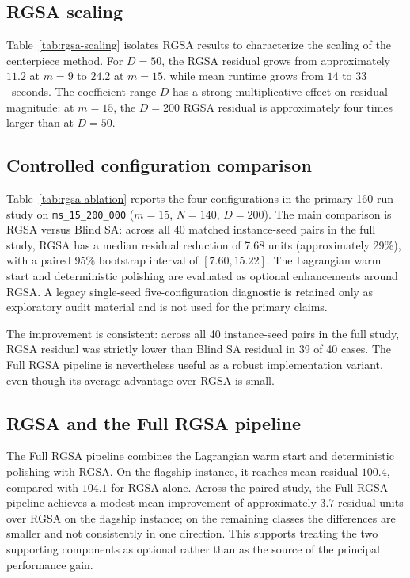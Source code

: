 \documentclass[11pt]{article}
\begin{document}


\subsection{RGSA scaling}

Table~\ref{tab:rgsa-scaling} isolates RGSA results to characterize the scaling of the centerpiece method. For $D=50$, the RGSA residual grows from approximately $11.2$ at $m=9$ to $24.2$ at $m=15$, while mean runtime grows from $14$ to $33$~seconds. The coefficient range $D$ has a strong multiplicative effect on residual magnitude: at $m=15$, the $D=200$ RGSA residual is approximately four times larger than at $D=50$.



\subsection{Controlled configuration comparison}
Table~\ref{tab:rgsa-ablation} reports the four configurations in the primary 160-run study on \texttt{ms\_15\_200\_000} ($m=15$, $N=140$, $D=200$). The main comparison is RGSA versus Blind SA: across all 40 matched instance-seed pairs in the full study, RGSA has a median residual reduction of 7.68 units (approximately 29\%), with a paired 95\% bootstrap interval of $[7.60,15.22]$. The Lagrangian warm start and deterministic polishing are evaluated as optional enhancements around RGSA. A legacy single-seed five-configuration diagnostic is retained only as exploratory audit material and is not used for the primary claims.



The improvement is consistent: across all 40 instance-seed pairs in the full study, RGSA residual was strictly lower than Blind SA residual in 39 of 40 cases. The Full RGSA pipeline is nevertheless useful as a robust implementation variant, even though its average advantage over RGSA is small.

\subsection{RGSA and the Full RGSA pipeline}

The Full RGSA pipeline combines the Lagrangian warm start and deterministic polishing with RGSA. On the flagship instance, it reaches mean residual $100.4$, compared with $104.1$ for RGSA alone. Across the paired study, the Full RGSA pipeline achieves a modest mean improvement of approximately $3.7$ residual units over RGSA on the flagship instance; on the remaining classes the differences are smaller and not consistently in one direction. This supports treating the two supporting components as optional rather than as the source of the principal performance gain.
\end{document}
